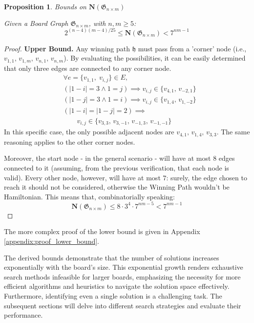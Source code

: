 \documentclass[conference]{IEEEtran}
\newtheorem{proposition}{Proposition}[section]
\begin{document}
\begin{proposition}{Bounds on $\mathbf{N}(\mathfrak{G}_{n \times m})$}{}
\label{prop:bounds_number_of_solutions}

Given a Board Graph $\mathfrak{G}_{n \times m}$, with $n, m \ge 5$:
$$
    2^{(n - 4)(m - 4)/25} \le \mathbf{N}(\mathfrak{G}_{n \times m}) < 7^{nm - 1}
$$
\end{proposition}
\begin{proof}
    \textbf{Upper Bound.} 
        Any winning path $\mathfrak{h}$ must pass from a 'corner' node (i.e., $v_{1,1},\,v_{1,m},\,v_{n,1},\,v_{n,m}$). By evaluating the possibilities, it can be easily determined that only three edges are connected to any corner node.
        \begin{align*}
            &\forall e = \{v_{1,1},\;v_{i,j}\} \in E, \\
            &(|1 - i| = 3 \land 1 = j) \implies v_{i,j} \in \{v_{4,1},\,v_{-2,1}\} \\
            &(|1 - j| = 3 \land 1 = i) \implies v_{i,j} \in \{v_{1,4},\,v_{1,-2}\} \\
            &(|1 - i| = |1 - j| = 2) \implies \\
            &\quad\quad v_{i,j} \in \{v_{3,3},\,v_{3,-1},\,v_{-1,3},\,v_{-1,-1}\}
        \end{align*}
        In this specific case, the only possible adjacent nodes are $v_{4,1},\,v_{1,4},\,v_{3,3}$. The same reasoning applies to the other corner nodes.

        Moreover, the start node - in the general scenario - will have at most $8$ edges connected to it (assuming, from the previous verification, that each node is valid). Every other node, however, will have at most $7$: surely, the edge chosen to reach it should not be considered, otherwise the Winning Path wouldn't be Hamiltonian.
        This means that, combinatorially speaking:
        $$
            \mathbf{N}(\mathfrak{G}_{n \times m}) \leq 8 \cdot 3^4 \cdot 7^{nm - 5} < 7^{nm - 1}
        $$
\end{proof}
The more complex proof of the lower bound is given in Appendix \ref{appendix:proof_lower_bound}.

The derived bounds demonstrate that the number of solutions increases exponentially with the board's size. This exponential growth renders exhaustive search methods infeasible for larger boards, emphasizing the necessity for more efficient algorithms and heuristics to navigate the solution space effectively. 
Furthermore, identifying even a single solution is a challenging task. The subsequent sections will delve into different search strategies and evaluate their performance.
\end{document}
